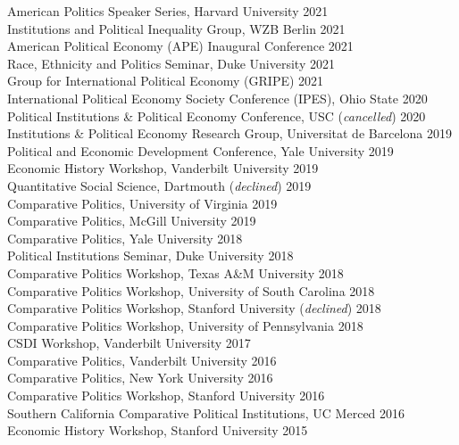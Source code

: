 \documentclass[11pt]{article}
\begin{document}
\vspace{.3in}
\begin{minipage}[t]{.21\textwidth}
	\hspace*{.18in} \so{}
\end{minipage}
\begin{minipage}[t]{.79\textwidth}


	American Politics Speaker Series, Harvard University \hfill 2021 \\
	Institutions and Political Inequality Group, WZB Berlin \hfill 2021 \\
	American Political Economy (APE) Inaugural Conference \hfill 2021 \\
	Race, Ethnicity and Politics Seminar, Duke University \hfill 2021 \\
	Group for International Political Economy (GRIPE) \hfill 2021 \\
	International Political Economy Society Conference (IPES), Ohio State \hfill 2020 \\
	Political Institutions \& Political Economy Conference, USC (\emph{cancelled}) \hfill 2020 \\
	Institutions \& Political Economy Research Group, Universitat de Barcelona \hfill 2019 \\
	Political and Economic Development Conference, Yale University \hfill 2019 \\
	Economic History Workshop, Vanderbilt University \hfill 2019 \\
	Quantitative Social Science, Dartmouth (\emph{declined}) \hfill 2019 \\
	Comparative Politics, University of Virginia \hfill 2019 \\
	Comparative Politics, McGill University \hfill 2019 \\
	Comparative Politics, Yale University \hfill 2018 \\
	Political Institutions Seminar, Duke University \hfill 2018 \\
	Comparative Politics Workshop, Texas A\&M University \hfill 2018 \\
	Comparative Politics Workshop, University of South Carolina \hfill 2018 \\
Comparative Politics Workshop, Stanford University (\emph{declined}) \hfill 2018 \\
Comparative Politics Workshop, University of Pennsylvania \hfill 2018 \\
CSDI Workshop, Vanderbilt University \hfill 2017 \\
Comparative Politics, Vanderbilt University \hfill 2016 \\
Comparative Politics, New York University \hfill 2016 \\
Comparative Politics Workshop, Stanford University \hfill 2016 \\
Southern California Comparative Political Institutions, UC Merced \hfill 2016 \\
Economic History Workshop, Stanford University \hfill 2015 \\
\end{minipage}
\end{document}

